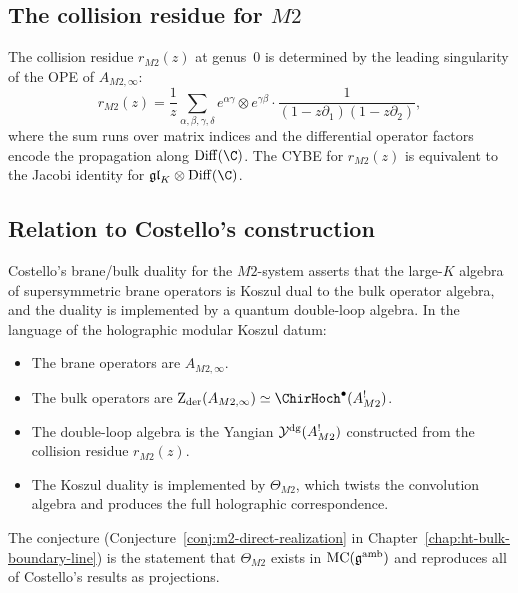 \subsection{The collision residue for $M2$}

\begin{computation}
The collision residue $r_{M2}(z)$ at genus~$0$ is determined by
the leading singularity of the OPE of $A_{M2,\infty}$:
\begin{equation}%
r_{M2}(z)
= \frac{1}{z} \sum_{\alpha,\beta,\gamma,\delta}
e^{\alpha\gamma} \otimes e^{\gamma\beta}
\cdot \frac{1}{(1 - z\partial_1)(1 - z\partial_2)},
\end{equation}
where the sum runs over matrix indices and the differential operator
factors encode the propagation along $\Diff(\C)$. The CYBE for
$r_{M2}(z)$ is equivalent to the Jacobi identity for
$\mathfrak{gl}_K \otimes \Diff(\C)$.
\end{computation}


\subsection{Relation to Costello's construction}

\begin{remark}
Costello's brane/bulk duality for the $M2$-system asserts that the
large-$K$ algebra of supersymmetric brane operators is Koszul dual
to the bulk operator algebra, and the duality is implemented by a
quantum double-loop algebra. In the language of the holographic
modular Koszul datum:
\begin{itemize}
\item The brane operators are $A_{M2,\infty}$.
\item The bulk operators are $\Zder(A_{M2,\infty})
 \simeq \ChirHoch^\bullet(A^!_{M2})$.
\item The double-loop algebra is the Yangian $\mathcal{Y}^{\mathrm{dg}}(A^!_{M2})$
 constructed from the collision residue $r_{M2}(z)$.
\item The Koszul duality is implemented by $\Theta_{M2}$, which
 twists the convolution algebra and produces the full holographic
 correspondence.
\end{itemize}
The conjecture (Conjecture~\ref{conj:m2-direct-realization} in
Chapter~\ref{chap:ht-bulk-boundary-line}) is the statement that
$\Theta_{M2}$ exists in $\mathrm{MC}(\mathfrak{g}^{\mathrm{amb}})$ and
reproduces all of Costello's results as projections.
\end{remark}

